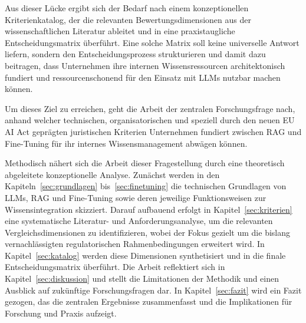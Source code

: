Aus dieser Lücke ergibt sich der Bedarf nach einem konzeptionellen Kriterienkatalog, der die relevanten Bewertungsdimensionen aus der wissenschaftlichen Literatur ableitet und in eine praxistaugliche Entscheidungsmatrix überführt. Eine solche Matrix soll keine universelle Antwort liefern, sondern den Entscheidungsprozess strukturieren und damit dazu beitragen, dass Unternehmen ihre internen Wissensressourcen architektonisch fundiert und ressourcenschonend für den Einsatz mit LLMs nutzbar machen können.

Um dieses Ziel zu erreichen, geht die Arbeit der zentralen Forschungsfrage nach, anhand welcher technischen, organisatorischen und speziell durch den neuen EU AI Act geprägten juristischen Kriterien Unternehmen fundiert zwischen RAG und Fine-Tuning für ihr internes Wissensmanagement abwägen können.

Methodisch nähert sich die Arbeit dieser Fragestellung durch eine theoretisch abgeleitete 
konzeptionelle Analyse. Zunächst werden in den Kapiteln~\ref{sec:grundlagen} bis~\ref{sec:finetuning} die technischen Grundlagen von LLMs, RAG und Fine-Tuning sowie deren jeweilige 
Funktionsweisen zur Wissensintegration skizziert. Darauf aufbauend erfolgt in Kapitel~\ref{sec:kriterien} eine systematische Literatur- und Anforderungsanalyse, um die relevanten Vergleichsdimensionen zu identifizieren, wobei der Fokus gezielt um die bislang vernachlässigten regulatorischen Rahmenbedingungen erweitert wird. In Kapitel~\ref{sec:katalog} werden diese Dimensionen synthetisiert und in die finale Entscheidungsmatrix überführt. Die Arbeit reflektiert sich in Kapitel~\ref{sec:diskussion} und stellt die Limitationen der Methodik und einen Ausblick auf zukünftige Forschungsfragen dar. In Kapitel~\ref{sec:fazit} wird ein Fazit gezogen, das die zentralen Ergebnisse zusammenfasst und die Implikationen für Forschung und Praxis aufzeigt.
